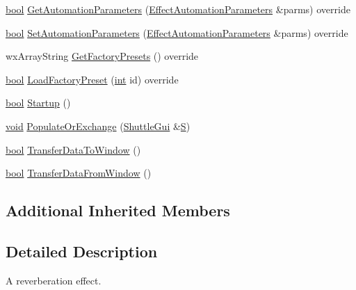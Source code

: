 \begin{DoxyCompactItemize}
\item 
\hyperlink{mac_2config_2i386_2lib-src_2libsoxr_2soxr-config_8h_abb452686968e48b67397da5f97445f5b}{bool} \hyperlink{class_effect_reverb_a36a6df034981287451769cd11a153590}{Get\+Automation\+Parameters} (\hyperlink{class_effect_automation_parameters}{Effect\+Automation\+Parameters} \&parms) override
\item 
\hyperlink{mac_2config_2i386_2lib-src_2libsoxr_2soxr-config_8h_abb452686968e48b67397da5f97445f5b}{bool} \hyperlink{class_effect_reverb_ad2136ae8643f35bc6ebf545c33ce80c0}{Set\+Automation\+Parameters} (\hyperlink{class_effect_automation_parameters}{Effect\+Automation\+Parameters} \&parms) override
\item 
wx\+Array\+String \hyperlink{class_effect_reverb_a5f00910198bbfeca3abcf1e979e4c193}{Get\+Factory\+Presets} () override
\item 
\hyperlink{mac_2config_2i386_2lib-src_2libsoxr_2soxr-config_8h_abb452686968e48b67397da5f97445f5b}{bool} \hyperlink{class_effect_reverb_a21f586a82b4d733a1855a705c88e7ba3}{Load\+Factory\+Preset} (\hyperlink{xmltok_8h_a5a0d4a5641ce434f1d23533f2b2e6653}{int} id) override
\item 
\hyperlink{mac_2config_2i386_2lib-src_2libsoxr_2soxr-config_8h_abb452686968e48b67397da5f97445f5b}{bool} \hyperlink{class_effect_reverb_aaa5ed0bf17b809c437fcfec04722a8b1}{Startup} ()
\item 
\hyperlink{sound_8c_ae35f5844602719cf66324f4de2a658b3}{void} \hyperlink{class_effect_reverb_a1a8a05f34a38458f1258a9be66c8569c}{Populate\+Or\+Exchange} (\hyperlink{class_shuttle_gui}{Shuttle\+Gui} \&\hyperlink{xlftab_8c_af933676109efed7ab34cea71d748a517}{S})
\item 
\hyperlink{mac_2config_2i386_2lib-src_2libsoxr_2soxr-config_8h_abb452686968e48b67397da5f97445f5b}{bool} \hyperlink{class_effect_reverb_a2ba204eec94b04e08b1bf4d56ed68d98}{Transfer\+Data\+To\+Window} ()
\item 
\hyperlink{mac_2config_2i386_2lib-src_2libsoxr_2soxr-config_8h_abb452686968e48b67397da5f97445f5b}{bool} \hyperlink{class_effect_reverb_a12bae8297a58f85103ee80918eb8e172}{Transfer\+Data\+From\+Window} ()
\end{DoxyCompactItemize}
\subsection*{Additional Inherited Members}


\subsection{Detailed Description}
A reverberation effect. 


